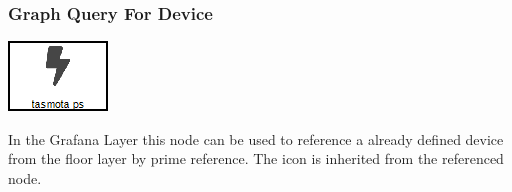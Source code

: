 \subsubsection{Graph Query For Device}
\noindent\begin{minipage}{0.15\textwidth}%
	\includegraphics[width=\linewidth]{assets/images/sensor}
\end{minipage}%
\hfill%
\begin{minipage}{0.8\textwidth}
	In the Grafana Layer this node can be used to reference a already defined device from the floor layer by prime reference. The icon is inherited from the referenced node.
\end{minipage}

